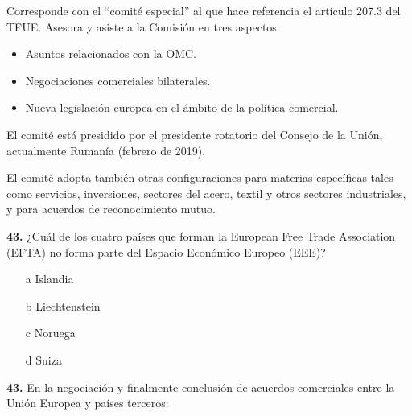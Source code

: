 \documentclass{nuevotema}
\begin{document}
\conceptos


Corresponde con el ``comité especial'' al que hace referencia el artículo 207.3 del TFUE. Asesora y asiste a la Comisión en tres aspectos:

\begin{itemize}
	\item Asuntos relacionados con la OMC.
	\item Negociaciones comerciales bilaterales.
	\item Nueva legislación europea en el ámbito de la política comercial.
\end{itemize}

El comité está presidido por el presidente rotatorio del Consejo de la Unión, actualmente Rumanía (febrero de 2019).

El comité adopta también otras configuraciones para materias específicas tales como servicios, inversiones, sectores del acero, textil y otros sectores industriales, y para acuerdos de reconocimiento mutuo.

\preguntas


\textbf{43.} ¿Cuál de los cuatro países que forman la European Free Trade Association (EFTA) no forma parte del Espacio Económico Europeo (EEE)?

\begin{itemize}
	\item[a] Islandia
	\item[b] Liechtenstein
	\item[c] Noruega
	\item[d] Suiza
\end{itemize}

\textbf{43.} En la negociación y finalmente conclusión de acuerdos comerciales entre la Unión Europea y países terceros:
\end{document}
